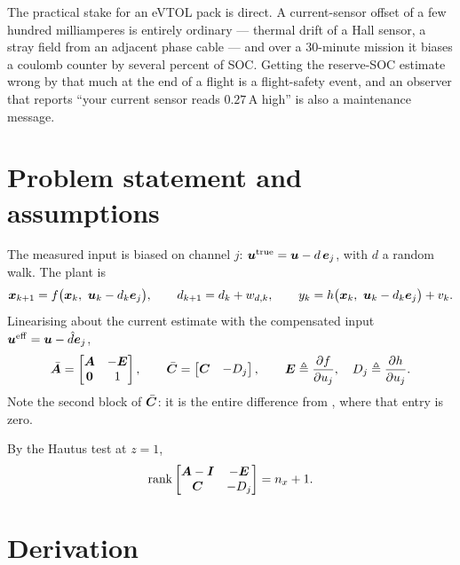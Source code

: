 The practical stake for an eVTOL pack is direct.  A current-sensor offset of a few hundred
milliamperes is entirely ordinary --- thermal drift of a Hall sensor, a stray field from an
adjacent phase cable --- and over a $30$-minute mission it biases a coulomb counter by several
percent of SOC.  Getting the reserve-SOC estimate wrong by that much at the end of a flight is a
flight-safety event, and an observer that reports ``your current sensor reads $0.27$\,A high''
is also a maintenance message.

\section{Problem statement and assumptions}
The measured input is biased on channel $j$: $\bm{u}^{\mathrm{true}} = \bm{u} - d\,\bm{e}_j$, with $d$ a
random walk.  The plant is
\begin{equation}
\bm{x}_{k+1} = f\big(\bm{x}_k,\ \bm{u}_k - d_k\bm{e}_j\big) , \qquad
d_{k+1} = d_k + w_{d,k} , \qquad
y_k = h\big(\bm{x}_k,\ \bm{u}_k - d_k\bm{e}_j\big) + v_k .
\label{eq:dob-plant}
\end{equation}
Linearising about the current estimate with the compensated input
$\bm{u}^{\mathrm{eff}} = \bm{u} - \hat{d}\bm{e}_j$,
\begin{equation}
\bar{\bm{A}} = \begin{bmatrix}\bm{A} & -\bm{E}\\ \bm{0} & 1\end{bmatrix} , \qquad
\bar{\bm{C}} = \begin{bmatrix}\bm{C} & -D_j\end{bmatrix} , \qquad
\bm{E} \triangleq \frac{\partial f}{\partial u_j} ,\quad D_j \triangleq \frac{\partial h}{\partial u_j} .
\label{eq:dob-aug}
\end{equation}
Note the second block of $\bar{\bm{C}}$: it is the entire difference from , where that
entry is zero.
\begin{assumption}\label{as:dob-obs}
By the Hautus test at $z=1$,
\begin{equation}
\operatorname{rank}\begin{bmatrix}\bm{A}-\bm{I} & -\bm{E}\\ \bm{C} & -D_j\end{bmatrix} = n_x+1 .
\label{eq:dob-hautus}
\end{equation}
\end{assumption}

\section{Derivation}

